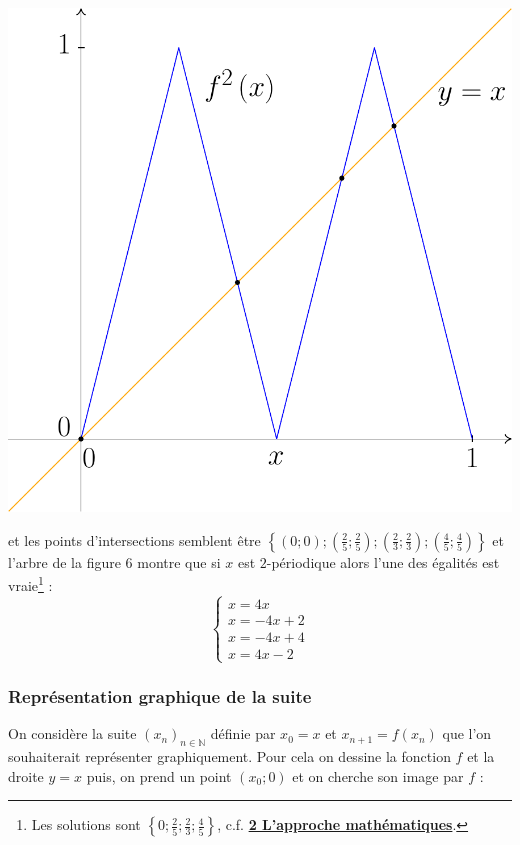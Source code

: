 \documentclass[a4paper,french,12pt]{article}
\begin{document}
\begin{center}
\includegraphics[scale=0.45]{../TeXGraph/Pdf/graphique_etape_2_periode.pdf}
\end{center}
et les points d'intersections semblent être $\left\{\left(0;0\right);\left(\frac{2}{5};\frac{2}{5}\right);\left(\frac{2}{3};\frac{2}{3}\right);\left(\frac{4}{5};\frac{4}{5}\right)\right\}$ et l'arbre de la figure $6$ montre que si $x$ est $2$-périodique alors l'une des égalités est vraie\footnote{Les solutions sont $\left\{0;\frac{2}{5};\frac{2}{3};\frac{4}{5}\right\}$, c.f. \hyperlink{2}{\textbf{2 L’approche mathématiques}}.} :
\[\begin{cases}x=4x\\x=-4x+2\\x=-4x+4\\x=4x-2\end{cases}\]


\subsubsection{Représentation graphique de la suite}
On considère la suite $\left(x_n\right)_{n\in\mathbb{N}}$ définie par $x_0=x$ et $x_{n+1}=f\left(x_n\right)$ que l'on souhaiterait représenter graphiquement. Pour cela on dessine la fonction $f$ et la droite $y=x$ puis, on prend un point $\left(x_0;0\right)$ et on cherche son image par $f$ :
\end{document}
